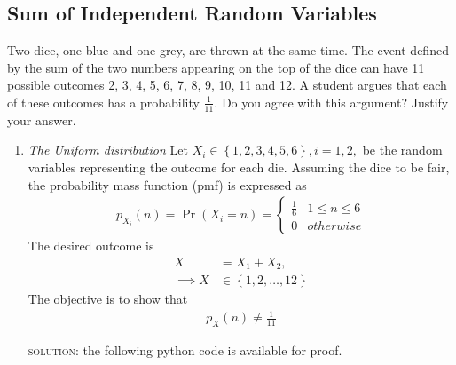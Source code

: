 \documentclass{article}
\numberwithin{equation}{subsection}
\numberwithin{figure}{subsection}
\providecommand{\cbrak}[1]{\ensuremath{\left\{#1\right\}}}
\providecommand{\pr}[1]{\ensuremath{\Pr\left(#1\right)}}
\renewcommand\thesection{\arabic{section}}
\renewcommand\thesubsection{\thesection.\arabic{subsection}}
\begin{document}
\subsection{Sum of Independent Random Variables}
Two dice, one blue and one grey, are thrown at the same time.   The event defined by the sum of the two numbers appearing on the top of the dice can have 11 possible outcomes 2, 3, 4, 5, 6, 7, 8, 9, 10, 11 and 12.  A student argues that each of these outcomes has a probability $\frac{1}{11}$.  Do you agree with this argument?  Justify your answer.
\begin{enumerate}[label=\thesubsection.\arabic*.,ref=\thesubsection.\arabic{figure}]
\item {\em The Uniform distribution} Let $X_i \in \cbrak{1,2,3,4,5,6}, i = 1,2,$ be the random variables representing the outcome for each die.  Assuming the dice to be fair, the probability mass function (pmf) is expressed as 
\begin{align}
\label{eq:dice_pmf_xi}
p_{X_i}(n) = \pr{X_i = n} =
\begin{cases}
\frac{1}{6} & 1 \le n \le 6
\\
0 & otherwise
\end{cases}
\end{align}
The desired outcome is
\begin{align}
\label{eq:dice_xdef}
X &= X_1 + X_2,
\\
\implies X &\in \cbrak{1,2,\dots,12}
\end{align}
The objective is to show that
\begin{align}
p_X(n) \ne \frac{1}{11}
\label{eq:dice_wrong}
\end{align}
\begin{flushleft}
 \textsc{solution:} the following python code is available for proof.
 \end{flushleft}
 \begin{center}
\end{center}
 

\end{enumerate}
\end{document}
